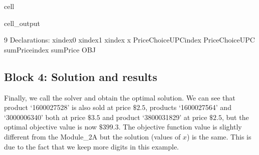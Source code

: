 \documentclass[letterpaper,10pt,english]{jupyterBook}
\begin{document}
\begin{sphinxuseclass}{cell}
\begin{sphinxVerbatimOutput}
\begin{sphinxuseclass}{cell_output}
\begin{sphinxVerbatim}[commandchars=\\\{\}]
9 Declarations: x\PYGZus{}index\PYGZus{}0 x\PYGZus{}index\PYGZus{}1 x\PYGZus{}index x PriceChoiceUPC\PYGZus{}index PriceChoiceUPC sumPrice\PYGZus{}index sumPrice OBJ
\end{sphinxVerbatim}

\end{sphinxuseclass}\end{sphinxVerbatimOutput}

\end{sphinxuseclass}

\subsection{Block 4: Solution and results}
\label{\detokenize{docs/Case1_5_Module2B_Retail_Price_Optimization_Script:block-4-solution-and-results}}
\sphinxAtStartPar
Finally, we call the solver and obtain the optimal solution. We can see that product ‘1600027528’ is also sold at price \(\$2.5\), products ‘1600027564’ and ‘3000006340’ both  at price \(\$3.5\) and product ‘3800031829’ at price \(\$2.5\), but the optimal objective value is now \(\$399.3\). The objective function value is slightly different from the Module\_2A but the solution (values of \(x\)) is the same. This is due to the fact that we keep more digits in this example.
\end{document}
